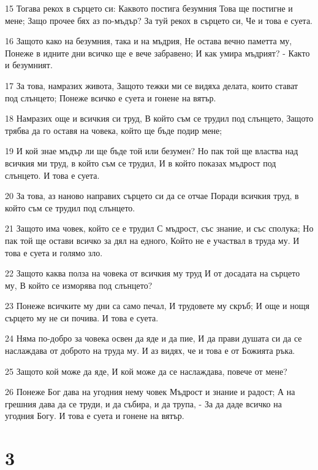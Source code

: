 \par 15 Тогава рекох в сърцето си: Каквото постига безумния Това ще постигне и мене; Защо прочее бях аз по-мъдър? За туй рекох в сърцето си, Че и това е суета.
\par 16 Защото како на безумния, така и на мъдрия, Не остава вечно паметта му, Понеже в идните дни всичко ще е вече забравено; И как умира мъдрият? - Както и безумният.
\par 17 За това, намразих живота, Защото тежки ми се видяха делата, които стават под слънцето; Понеже всичко е суета и гонене на вятър.
\par 18 Намразих още и всичкия си труд, В който съм се трудил под слънцето, Защото трябва да го оставя на човека, който ще бъде подир мене;
\par 19 И кой знае мъдър ли ще бъде той или безумен? Но пак той ще властва над всичкия ми труд, в който съм се трудил, И в който показах мъдрост под слънцето. И това е суета.
\par 20 За това, аз наново направих сърцето си да се отчае Поради всичкия труд, в който съм се трудил под слънцето.
\par 21 Защото има човек, който се е  трудил С мъдрост, със знание, и със сполука; Но пак той ще остави всичко  за дял на едного, Който не е участвал в труда му. И това е суета и голямо зло.
\par 22 Защото каква полза на човека от всичкия му труд И от досадата на сърцето му, В който се изморява под слънцето?
\par 23 Понеже всичките му дни са само печал, И трудовете му скръб; И още и нощя сърцето му не си почива. И това е суета.
\par 24 Няма по-добро за човека освен да яде и да пие, И да прави душата си да се наслаждава от доброто на труда му. И аз видях, че и това е от Божията ръка.
\par 25 Защото кой може да яде, И кой може да се наслаждава, повече от мене?
\par 26 Понеже Бог дава на угодния нему човек Мъдрост и знание и радост; А на грешния дава да се труди, и да събира, и да трупа, - За да даде всичко на угодния Богу. И това е суета и гонене на вятър.

\chapter{3}

